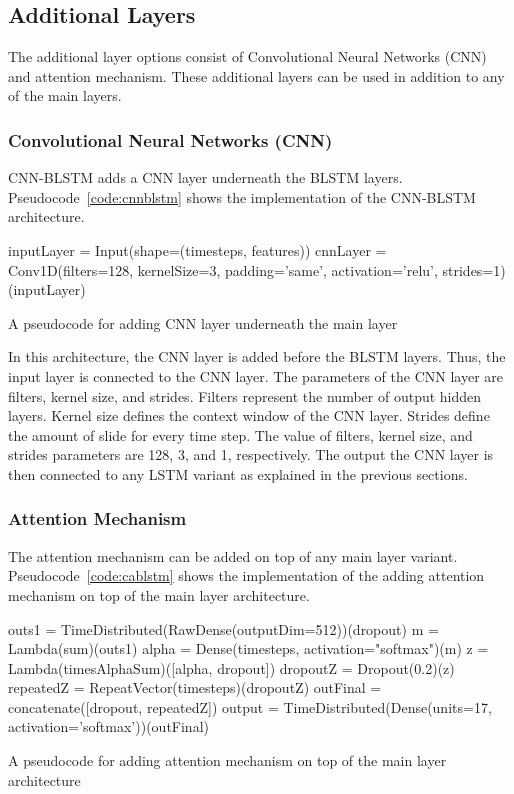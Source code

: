 \subsection{Additional Layers}
The additional layer options consist of Convolutional Neural Networks (CNN) and attention mechanism. These additional layers can be used in addition to any of the main layers.

\subsubsection{Convolutional Neural Networks (CNN)}
CNN-BLSTM adds a CNN layer underneath the BLSTM layers. Pseudocode~\ref{code:cnnblstm} shows the implementation of the CNN-BLSTM architecture.
\begin{kode}
	inputLayer = Input(shape=(timesteps, features))\;
	cnnLayer = Conv1D(filters=128, kernelSize=3, padding='same', activation='relu', strides=1)(inputLayer)\;
	\caption{A pseudocode for adding CNN layer underneath the main layer}
	\label{code:cnnblstm}
\end{kode}

In this architecture, the CNN layer is added before the BLSTM layers. Thus, the input layer is connected to the CNN layer. The parameters of the CNN layer are filters, kernel size, and strides. Filters represent the number of output hidden layers. Kernel size defines the context window of the CNN layer. Strides define the amount of slide for every time step. The value of filters, kernel size, and strides parameters are 128, 3, and 1, respectively. The output the CNN layer is then connected to any LSTM variant as explained in the previous sections.

\subsubsection{Attention Mechanism}
The attention mechanism can be added on top of any main layer variant. Pseudocode~\ref{code:cablstm} shows the implementation of the adding attention mechanism on top of the main layer architecture.
\begin{kode}
	outs1 = TimeDistributed(RawDense(outputDim=512))(dropout)\;
	m = Lambda(sum)(outs1)\;
	alpha = Dense(timesteps, activation="softmax")(m)\;
	z = Lambda(timesAlphaSum)([alpha, dropout])\;
	dropoutZ = Dropout(0.2)(z)\;
	repeatedZ = RepeatVector(timesteps)(dropoutZ)\;
	outFinal = concatenate([dropout, repeatedZ])\;	
	output = TimeDistributed(Dense(units=17, activation='softmax'))(outFinal)\;
	
	\caption{A pseudocode for adding attention mechanism on top of the main layer architecture}
	\label{code:cablstm}
\end{kode}

